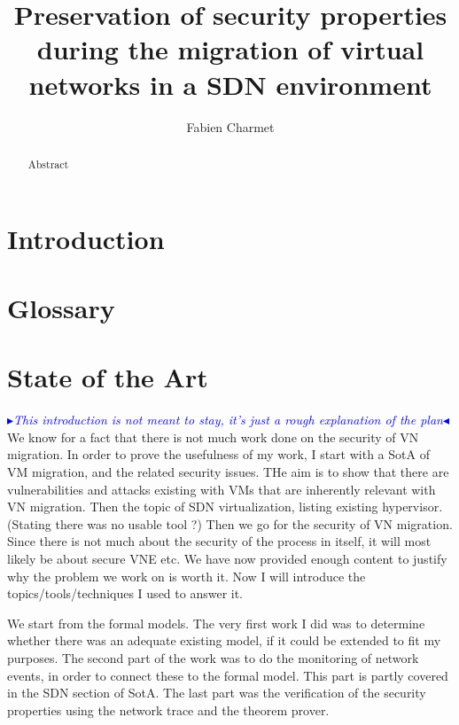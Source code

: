 \documentclass[a4paper, 11pt]{article}
\title{\LARGE \bf Preservation of security properties during the migration of virtual networks in a SDN environment}
\author{Fabien Charmet}
\newcommand{\boxedtext}[1]{\fbox{\scriptsize\bfseries\textsf{#1}}}
\newcommand{\myremark}[2]{
   \textcolor{blue}{\boxedtext{#1}
      {\small$\blacktriangleright$\emph{\textsl{#2}}$\blacktriangleleft$}
}}
\newcommand\FC[1]{\myremark{FC}{#1}}
\begin{document}
\noindent
\maketitle

\begin{abstract}
Abstract
\end{abstract}

\tableofcontents
\thispagestyle{empty}


\section{Introduction}

 
\section{Glossary}



\newpage
\section{State of the Art}
\FC{This introduction is not meant to stay, it's just a rough explanation of the plan}
We know for a fact that there is not much work done on the security of VN migration.
In order to prove the usefulness of my work, I start with a SotA of VM migration, and the related security issues.
THe aim is to show that there are vulnerabilities and attacks existing with VMs that are inherently relevant with VN migration.
Then the topic of SDN virtualization, listing existing hypervisor. (Stating there was no usable tool ?)
Then we go for the security of VN migration. Since there is not much about the security of the process in itself, it will most likely be about secure VNE etc.
We have now provided enough content to justify why the problem we work on is worth it.
Now I will introduce the topics/tools/techniques I used to answer it.

We start from the formal models. The very first work I did was to determine whether there was an adequate existing model, if it could be extended to fit my purposes. 
The second part of the work was to do the monitoring of network events, in order to connect these to the formal model. This part is partly covered in the SDN section of SotA.
The last part was the verification of the security properties using the network trace and the theorem prover.
\end{document}
